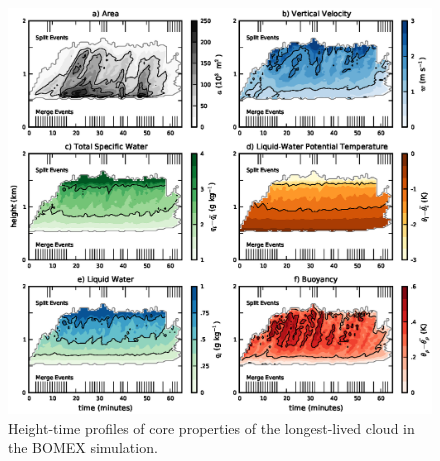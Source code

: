 \documentclass[acp]{copernicus}
\begin{document}
\begin{figure}[t]
\vspace*{2mm}
\begin{center}
\includegraphics[width=\textwidth]{./figures/example_core}
\end{center}
\caption{Height-time profiles of core properties of the longest-lived cloud in 
the BOMEX simulation.}
\label{fig:example_core}
\end{figure}
\end{document}
